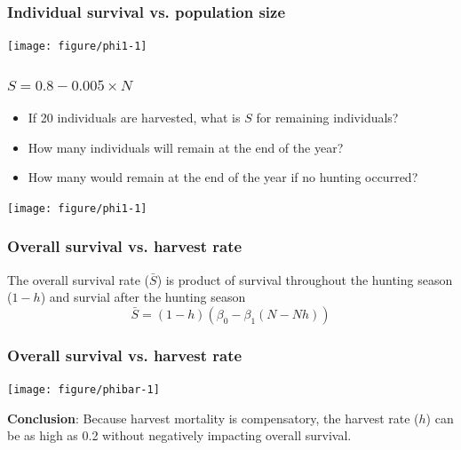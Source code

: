 \documentclass[color=usenames,dvipsnames,handout]{beamer}\usepackage[]{graphicx}\usepackage[]{color}
\begin{document}
\begin{frame}[fragile]
  \frametitle{Individual survival vs. population size}

\centering
\texttt{[image: figure/phi1-1]} \\
\end{frame}





\begin{frame}
  \frametitle{$S = 0.8 - 0.005 \times N$}
  \begin{itemize}[<+->]
    \small
    \item If 20 individuals are harvested, what is $S$ for
      remaining individuals?
    \item How many individuals will remain at the end of the year?
    \item How many would remain at the end of the year if no hunting
      occurred?
  \end{itemize}
  \begin{center}
    \texttt{[image: figure/phi1-1]}
  \end{center}
\end{frame}




\begin{frame}
  \frametitle{Overall survival vs. harvest rate}
  The overall survival rate ($\bar{S}$) is product of survival
  throughout the hunting season ($1-h$) and survial after the hunting
  season
  \Large
  \[
    \bar{S} = (1-h)(\beta_0 - \beta_1 (N - Nh))
  \]
\end{frame}


\begin{frame}[fragile]
  \frametitle{Overall survival vs. harvest rate}
  \vspace{-0.5cm}

\begin{center}
  \texttt{[image: figure/phibar-1]}
\end{center}
\pause
\small
{\bf Conclusion}: Because harvest mortality is compensatory, the
harvest rate ($h$) can be as high as 0.2 without negatively impacting
overall survival.
\end{frame}


\end{document}
